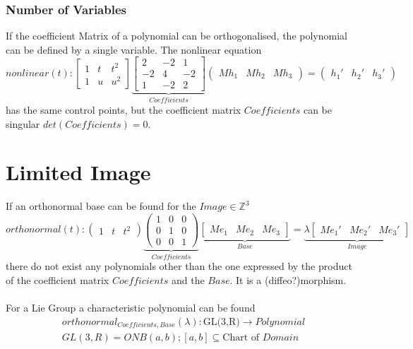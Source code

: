 \documentclass{report}
\begin{document}
\subsection{Number of Variables}
If the coefficient Matrix of a polynomial can be orthogonalised, the polynomial can be defined by a single variable. The nonlinear equation
\begin{equation}
nonlinear(t):
\begin{bmatrix}
1 & t & t^2\\
1 & u & u^2
\end{bmatrix}
\underbrace{\begin{bmatrix}
2 & -2 & 1\\
-2 & 4 & -2\\
1 & -2 & 2
\end{bmatrix}}_{Coefficients}
\begin{pmatrix}
Mh_{1} & Mh_{2} & Mh_{3}
\end{pmatrix}
=
\begin{pmatrix}
h_{1}' & h_{2}' & h_{3}'
\end{pmatrix}
\end{equation}
has the same control points, but the coefficient matrix $Coefficients$ can be singular $det(Coefficients)=0$.

\chapter{Limited Image}
If an orthonormal base can be found for the $Image \in \mathbb{Z}^3$
\begin{equation}
orthonormal(t):
\begin{pmatrix}
1 & t & t^2
\end{pmatrix}
\underbrace{\begin{pmatrix}
1 & 0 & 0\\
0 & 1 & 0\\
0 & 0 & 1
\end{pmatrix}}_{Coefficients}
\underbrace{\begin{bmatrix}
Me_{1} & Me_{2} & Me_{3}
\end{bmatrix}}_{Base}
=
\underbrace{
\lambda
\begin{bmatrix}
Me_{1}' & Me_{2}' & Me_{3}'
\end{bmatrix}}_{Image}
\end{equation}
there do not exist any polynomials other than the one expressed by the product of the coefficient matrix $Coefficients$ and the $Base$. It is a (diffeo?)morphism.\\\\
For a Lie Group a characteristic polynomial can be found
\begin{align}
orthonormal_{Coefficients,Base}(\lambda): \text{GL(3,R)} \rightarrow Polynomial\\
GL(3,R) = ONB(a,b); [a,b] \subseteq \text{Chart of }Domain
\end{align}
\end{document}
